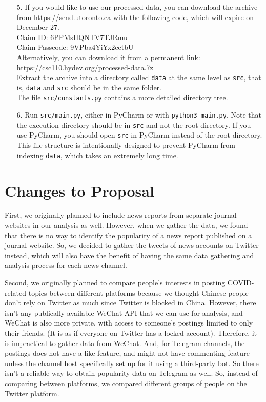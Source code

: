 \documentclass{article}
\begin{document}
\begin{itemize}
        \item [5. ] If you would like to use our processed data, you can download the archive from \url{https://send.utoronto.ca} with the following code, which will expire on December 27.\\
        Claim ID: 6PPMsHQNTV7TJRmu\\
        Claim Passcode: 9VPba4YiYx2cetbU\\
        Alternatively, you can download it from a permanent link: \url{https://csc110.hydev.org/processed-data.7z}\\
        Extract the archive into a directory called \verb|data| at the same level as \verb|src|, that is, \verb|data| and \verb|src| should be in the same folder.\\
        The file \verb|src/constants.py| contains a more detailed directory tree.
        
        \item [6. ] Run \verb|src/main.py|, either in PyCharm or with \texttt{python3 main.py}. Note that the execution directory should be in \verb|src| and not the root directory. If you use PyCharm, you should open \verb|src| in PyCharm instead of the root directory. This file structure is intentionally designed to prevent PyCharm from indexing \verb|data|, which takes an extremely long time.
        
    \end{itemize}

    \section{Changes to Proposal}
    \indent

    First, we originally planned to include news reports from separate journal websites in our analysis as well. However, when we gather the data, we found that there is no way to identify the popularity of a news report published on a journal website. So, we decided to gather the tweets of news accounts on Twitter instead, which will also have the benefit of having the same data gathering and analysis process for each news channel.

    Second, we originally planned to compare people's interests in posting COVID-related topics between different platforms because we thought Chinese people don't rely on Twitter as much since Twitter is blocked in China. However, there isn't any publically available WeChat API that we can use for analysis, and WeChat is also more private, with access to someone's postings limited to only their friends. (It is as if everyone on Twitter has a locked account). Therefore, it is impractical to gather data from WeChat. And, for Telegram channels, the postings does not have a like feature, and might not have commenting feature unless the channel host specifically set up for it using a third-party bot. So there isn't a reliable way to obtain popularity data on Telegram as well. So, instead of comparing between platforms, we compared different groups of people on the Twitter platform.
\end{document}
